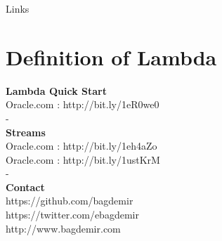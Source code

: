 \documentclass{beamer}
\begin{document}
	\begin{frame}[fragile]{Links}
		\section{Definition of Lambda}
		
		\textbf{Lambda Quick Start}\\
		Oracle.com : http://bit.ly/1eR0we0 \\
		-\\
		\textbf{Streams}\\
		Oracle.com : http://bit.ly/1eh4aZo\\
		Oracle.com : http://bit.ly/1ustKrM\\
		-\\
		\textbf{Contact}\\
		https://github.com/bagdemir\\
		https://twitter.com/ebagdemir\\
		http://www.bagdemir.com\\

	\end{frame}	
	
\end{document}
